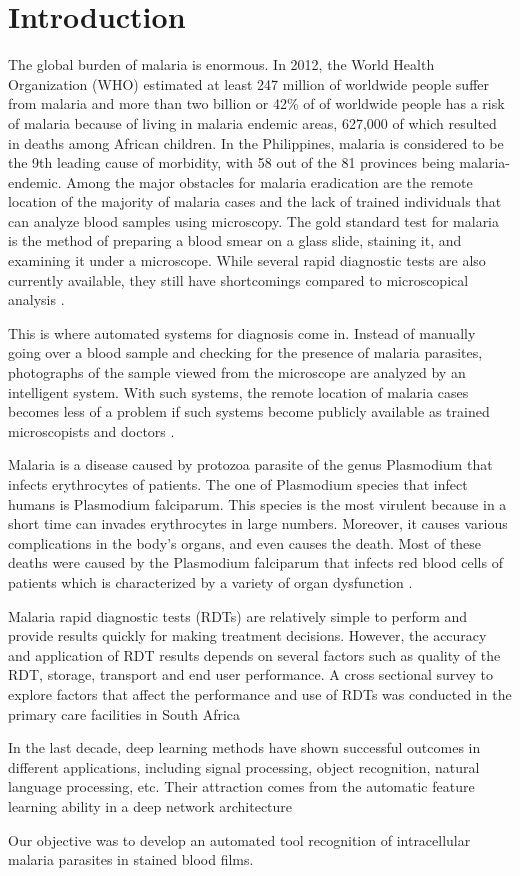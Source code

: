 \section{Introduction}
\label{intro}


The global burden of malaria is enormous. In 2012, the World Health Organization (WHO) estimated at least 247 million of worldwide people suffer from malaria and more than two billion or 42\% of of worldwide people has a risk of malaria because of living in malaria endemic areas, 627,000 of which resulted in deaths among African children. In the Philippines, malaria is considered to be the 9th leading cause of morbidity, with 58 out of the 81 provinces being malaria-endemic. Among the major obstacles for malaria eradication are the remote location of the majority of malaria cases and the lack of trained individuals that can analyze blood samples using
microscopy. The gold standard test for malaria is the method of preparing a blood smear on a glass slide, staining it, and examining it under a microscope. While several rapid diagnostic tests are also currently available, they still have shortcomings compared to microscopical analysis \cite{Quinn2016DeepDiagnostics}\cite{Premaratne2006AFilms}\cite{Penas2017}.


This is where automated systems for diagnosis
come in. Instead of manually going over a blood sample and
checking for the presence of malaria parasites, photographs
of the sample viewed from the microscope are analyzed by
an intelligent system. With such systems, the remote location
of malaria cases becomes less of a problem if such systems
become publicly available as trained microscopists and doctors \cite{Premaratne2006AFilms}\cite{Penas2017}.

Malaria is a disease caused by protozoa parasite of the genus Plasmodium that infects erythrocytes of patients. The one of Plasmodium species that infect humans is Plasmodium falciparum. This species is the most virulent because in a short time can invades erythrocytes in large numbers. Moreover, it causes various complications in the body's organs, and even causes the death. Most of these deaths were caused by the Plasmodium falciparum that infects red blood cells of patients which is characterized by a variety of organ dysfunction \cite{Dong2017}.


Malaria rapid diagnostic tests (RDTs) are relatively simple to perform and provide results quickly for making treatment decisions. However, the accuracy and application of RDT
results depends on several factors such as quality of the RDT, storage, transport and end user performance. A cross sectional survey to explore factors that affect the performance and use of
RDTs was conducted in the primary care facilities in South Africa \cite{Moonasar2007}


In the last decade, deep learning  methods have shown successful outcomes in different applications, including signal processing, object recognition, natural language processing, etc. Their attraction comes from the automatic feature learning ability in a deep network architecture 

Our objective was to develop an automated tool recognition of intracellular malaria parasites in stained blood films.   